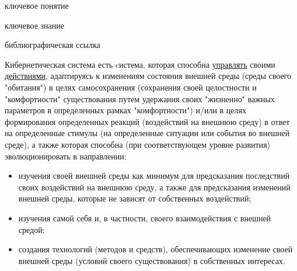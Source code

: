 \begin{SCn}

\bigskip

\begin{scnrelfromlist}{ключевое понятие}
\end{scnrelfromlist}

\bigskip

\begin{scnrelfromlist}{ключевое знание}
\end{scnrelfromlist}

\bigskip

\begin{scnrelfromlist}{библиографическая ссылка}
\end{scnrelfromlist}

\bigskip

Кибернетическая система есть cистема, которая способна \uline{управлять} своими \uline{действиями}, адаптируясь к изменениям состояния внешней среды (среды своего "обитания") в целях самосохранения (сохранения своей целостности и "комфортности"{} существования путем удержания своих "жизненно"{} важных параметров в определенных рамках "комфортности") и/или в целях формирования определенных реакций (воздействий на внешнюю среду) в ответ на определенные стимулы (на определенные ситуации или события во внешней среде), а также которая способна (при соответствующем уровне развития) эволюционировать в направлении:

\begin{itemize}
    \item изучения своей внешней среды как минимум для предсказания последствий своих воздействий на внешнюю среду, а также для предсказания изменений внешней среды, которые не зависят от собственных воздействий;
    \item изучения самой себя и, в частности, своего взаимодействия с внешней средой;
    \item создания технологий (методов и средств), обеспечивающих изменение своей внешней среды (условий своего существования) в собственных интересах.
\end{itemize}


\end{SCn}

